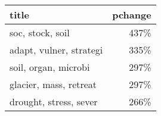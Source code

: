 \begin{tabular}{p{1.2cm}r}
\toprule
                   title &  pchange \\
\midrule
        soc, stock, soil &     437\% \\
 adapt, vulner, strategi &     335\% \\
    soil, organ, microbi &     297\% \\
  glacier, mass, retreat &     297\% \\
  drought, stress, sever &     266\% \\
\bottomrule
\end{tabular}
